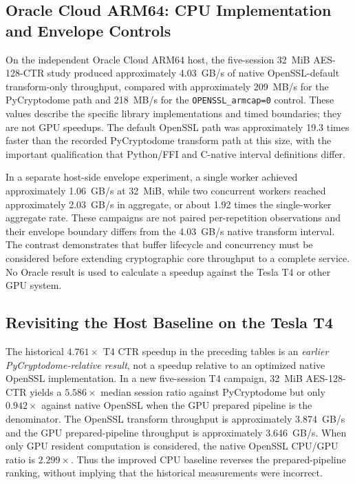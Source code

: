 \subsection{Oracle Cloud ARM64: CPU Implementation and Envelope Controls}
\label{sec:oracle-results}
On the independent Oracle Cloud ARM64 host, the five-session 32~MiB
AES-128-CTR study produced approximately 4.03~GB/s of native
OpenSSL-default transform-only throughput, compared with approximately
209~MB/s for the PyCryptodome path and 218~MB/s for the
\texttt{OPENSSL\_armcap=0} control. These values describe the specific
library implementations and timed boundaries; they are not GPU speedups.
The default OpenSSL path was approximately 19.3 times faster than the
recorded PyCryptodome transform path at this size, with the important
qualification that Python/FFI and C-native interval definitions differ.

In a separate host-side envelope experiment, a single worker achieved
approximately 1.06~GB/s at 32~MiB, while two concurrent workers reached
approximately 2.03~GB/s in aggregate, or about 1.92 times the
single-worker aggregate rate. These campaigns are not paired
per-repetition observations and their envelope boundary differs from the
4.03~GB/s native transform interval. The contrast demonstrates that
buffer lifecycle and concurrency must be considered before extending
cryptographic core throughput to a complete service. No Oracle result is
used to calculate a speedup against the Tesla T4 or other GPU system.

\subsection{Revisiting the Host Baseline on the Tesla T4}
\label{sec:new-t4-baseline}
The historical $4.761\times$ T4 CTR speedup in the preceding tables is an
\emph{earlier PyCryptodome-relative result}, not a speedup relative to an
optimized native OpenSSL implementation. In a new five-session T4 campaign,
32~MiB AES-128-CTR yields a $5.586\times$ median session ratio against
PyCryptodome but only $0.942\times$ against native OpenSSL when the GPU
prepared pipeline is the denominator. The OpenSSL transform throughput is
approximately 3.874~GB/s and the GPU prepared-pipeline throughput is
approximately 3.646~GB/s. When only GPU resident computation is considered,
the native OpenSSL CPU/GPU ratio is $2.299\times$. Thus the improved CPU
baseline reverses the prepared-pipeline ranking, without implying that the
historical measurements were incorrect.

